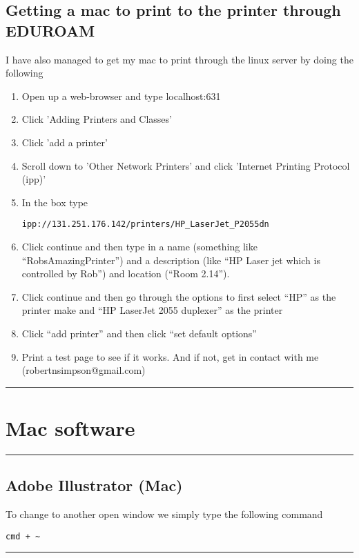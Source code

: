 \documentclass[a4paper, 10pt]{article}
\newcommand{\mytoprule}{\hrule\vspace{4mm}}
\newcommand{\mybotrule}{\vspace{4mm}\hrule}
\begin{document}
\subsection*{Getting a mac to print to the printer through EDUROAM}

I have also managed to get my mac to print through the linux server by doing the following
\begin{enumerate}
\item Open up a web-browser and type localhost:631
\item Click 'Adding Printers and Classes'
\item Click 'add a printer'
\item Scroll down to 'Other Network Printers' and click 'Internet Printing Protocol (ipp)'
\item In the box type 
\begin{verbatim}
ipp://131.251.176.142/printers/HP_LaserJet_P2055dn
\end{verbatim}
\item Click continue and then type in a name (something like ``RobsAmazingPrinter'') and a description (like ``HP Laser jet which is controlled by Rob'') and location (``Room 2.14'').
\item Click continue and then go through the options to first select ``HP'' as the printer make and ``HP LaserJet 2055 duplexer'' as the printer
\item Click ``add printer'' and then click ``set default options''
\item Print a test page to see if it works. And if not, get in contact with me (robertnsimpson@gmail.com) 
\end{enumerate}

\mybotrule

\vspace{10mm}
\section*{Mac software}

\mytoprule
\subsection*{Adobe Illustrator (Mac)}
To change to another open window we simply type the following command
\begin{Verbatim}[commandchars=\\\{\}]
cmd + ~
\end{Verbatim}
\mybotrule
\end{document}
